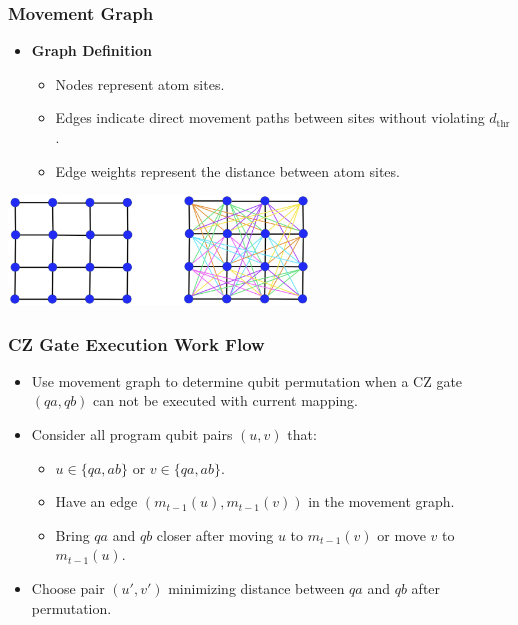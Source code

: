 \documentclass[18 pt]{beamer}
\begin{document}
\begin{frame}
    \frametitle{Movement Graph}
    \begin{itemize}
        \item \textbf{Graph Definition}
        \begin{itemize}
            \item Nodes represent atom sites.
            \item Edges indicate direct movement paths between sites without violating $d_{\text{thr}}$.
            \item Edge weights represent the distance between atom sites.
        \end{itemize}
    \end{itemize}
    \begin{center}
        \includegraphics[width=0.6\textwidth]{move.png}
    \end{center}
\end{frame}
\begin{frame}
    \frametitle{CZ Gate Execution Work Flow}
    \begin{itemize}
        \item Use movement graph to determine qubit permutation when a CZ gate $(qa, qb)$ can not be executed with current mapping.
        \item Consider all program qubit pairs $(u, v)$ that:
        \begin{itemize}
            \item $u\in\{qa,ab\}$ or $v\in\{qa,ab\}$.
            \item Have an edge \((m_{t-1}(u), m_{t-1}(v))\) in the movement graph.
            \item Bring $qa$ and $qb$ closer after moving $u$ to $m_{t-1}(v)$ or move $v$ to $m_{t-1}(u)$.
        \end{itemize}
        \item Choose pair $(u', v')$ minimizing distance between $qa$ and $qb$ after permutation.
    \end{itemize}
\end{frame}
\end{document}
